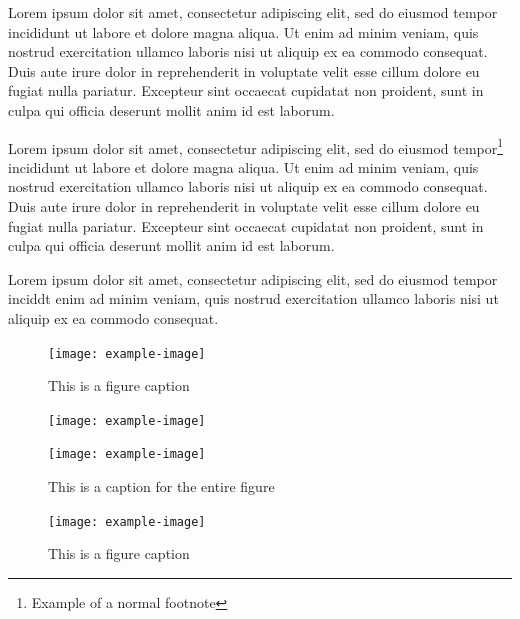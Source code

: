 \documentclass{cup-ino}
\begin{document}
Lorem ipsum dolor sit amet, consectetur adipiscing elit, sed do eiusmod tempor incididunt ut labore et dolore magna aliqua. Ut enim ad minim veniam, quis nostrud exercitation ullamco laboris nisi ut aliquip ex ea commodo consequat. Duis aute irure dolor in reprehenderit in voluptate velit esse cillum dolore eu fugiat nulla pariatur. Excepteur sint occaecat cupidatat non proident, sunt in culpa qui officia deserunt mollit anim id est laborum.

Lorem ipsum dolor sit amet, consectetur adipiscing elit, sed do eiusmod tempor\footnote{Example of a normal footnote} incididunt ut labore et dolore magna aliqua. Ut enim ad minim veniam, quis nostrud exercitation ullamco laboris nisi ut aliquip ex ea commodo consequat. Duis aute irure dolor in reprehenderit in voluptate velit esse cillum dolore eu fugiat nulla pariatur. Excepteur sint occaecat cupidatat non proident, sunt in culpa qui officia deserunt mollit anim id est laborum.

Lorem ipsum dolor sit amet, consectetur adipiscing elit, sed do eiusmod tempor inciddt enim ad minim veniam, quis nostrud exercitation ullamco laboris nisi ut aliquip ex ea commodo consequat. 


\begin{figure}
\centering
\texttt{[image: example-image]}
\caption{This is a figure caption}
\label{fig:example}
\end{figure}


\begin{figure}[bt!]
\begin{minipage}{0.47\textwidth}
\texttt{[image: example-image]}
\end{minipage}
\hfill
\begin{minipage}{0.47\textwidth}
\texttt{[image: example-image]}
\end{minipage}

\caption{This is a caption for the entire figure}
\label{fig:twosubs}
\end{figure}

\begin{figure}
\centering
\texttt{[image: example-image]}
\caption{This is a figure caption}
\label{fig:landscape}
\end{figure}
\end{document}
